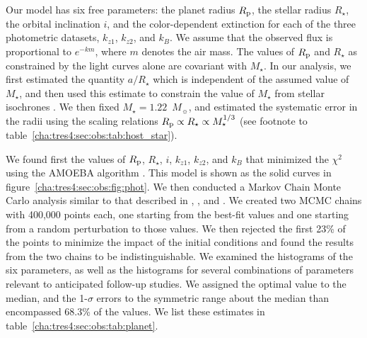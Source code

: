 Our model has six free parameters: the planet radius $R_{\rm p}$, the stellar
radius $R_{\star}$, the orbital inclination $i$, and the color-dependent extinction for each of the three photometric datasets,
$k_{z1}$, $k_{z2}$, and $k_B$. We assume that the observed flux is proportional
to $e^{-km}$, where $m$ denotes the air mass. The values of $R_{\rm p}$ and
$R_{\star}$ as constrained by the light curves alone are covariant with
$M_{\star}$. In our analysis, we first estimated the quantity $a / R_{\star}$ which
is independent of the assumed value of $M_{\star}$, and then used this estimate
to constrain the value of $M_{\star}$ from stellar isochrones
\citep{Sozzetti_Torres_Charbonneau:apj:2007a, Holman_Winn_Latham:apj:2007a}. We then fixed $M_{\star} = 1.22$~$M_{\sun}$, and
estimated the systematic error in the radii using the scaling
relations $R_{\rm p} \propto R_{\star} \propto M_{\star}^{1/3}$ (see footnote to
table~\ref{cha:tres4:sec:obs:tab:host_star}).

We found first the values of $R_{\rm p}$, $R_{\star}$, $i$, $k_{z1}$, $k_{z2}$,
and $k_B$ that minimized the ${\chi}^{2}$ using the AMOEBA algorithm
\citep{Press_Teukolsky_Vetterling:1992a}. This model is shown as the solid curves in figure~\ref{cha:tres4:sec:obs:fig:phot}.
We then conducted a Markov Chain Monte Carlo analysis similar to that described
in \citet{Holman_Winn_Latham:apj:2006a}, \citet{Charbonneau_Winn_Everett:apj:2007a}, and \citet{Winn_Holman_Roussanova:apj:2007a}.
We created two MCMC chains
with 400,000 points each, one starting from the best-fit values and one
starting from a random perturbation to those values. We
then rejected the first 23\% of the points to minimize the impact of
the initial conditions and found the results from the two chains to be
indistinguishable. We examined the histograms of the six parameters, as well as
the histograms for several combinations of parameters relevant to anticipated
follow-up studies. We assigned the optimal value to the median, and the
1-$\sigma$ errors to the symmetric range about the median than encompassed
68.3\% of the values. We list these estimates in table~\ref{cha:tres4:sec:obs:tab:planet}.

